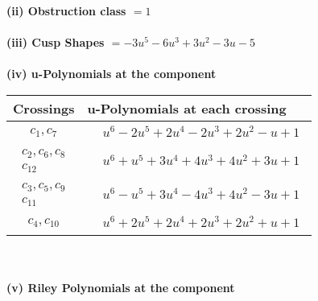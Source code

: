 \documentclass[1p]{elsarticle_modified}
\theoremstyle{definition}
\begin{document}
\flushleft \textbf{(ii) Obstruction class $= 1$}\\~\\
\flushleft \textbf{(iii) Cusp Shapes $= -3 u^5-6 u^3+3 u^2-3 u-5$}\\~\\
\newpage\renewcommand{\arraystretch}{1}
\flushleft \textbf{(iv) u-Polynomials at the component}\newline \\
\begin{tabular}{m{50pt}|m{274pt}}
Crossings & \hspace{64pt}u-Polynomials at each crossing \\
\hline $$\begin{aligned}c_{1},c_{7}\end{aligned}$$&$\begin{aligned}
&u^6-2 u^5+2 u^4-2 u^3+2 u^2- u+1
\end{aligned}$\\
\hline $$\begin{aligned}c_{2},c_{6},c_{8}\\c_{12}\end{aligned}$$&$\begin{aligned}
&u^6+u^5+3 u^4+4 u^3+4 u^2+3 u+1
\end{aligned}$\\
\hline $$\begin{aligned}c_{3},c_{5},c_{9}\\c_{11}\end{aligned}$$&$\begin{aligned}
&u^6- u^5+3 u^4-4 u^3+4 u^2-3 u+1
\end{aligned}$\\
\hline $$\begin{aligned}c_{4},c_{10}\end{aligned}$$&$\begin{aligned}
&u^6+2 u^5+2 u^4+2 u^3+2 u^2+u+1
\end{aligned}$\\
\hline
\end{tabular}\\~\\
\newpage\renewcommand{\arraystretch}{1}
\flushleft \textbf{(v) Riley Polynomials at the component}\newline \\
\end{document}
